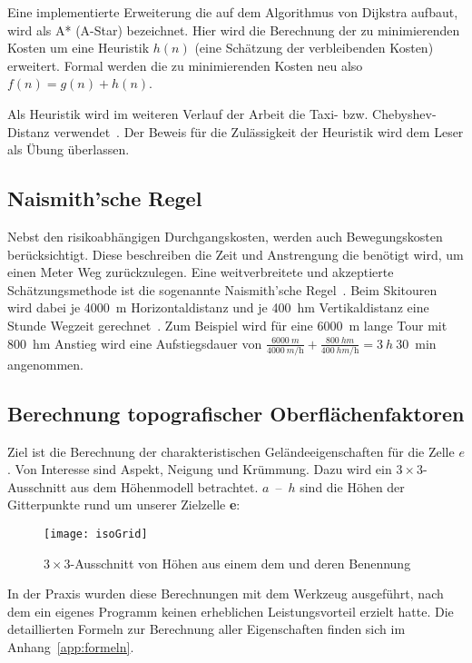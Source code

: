 Eine implementierte Erweiterung die auf dem Algorithmus von Dijkstra aufbaut, wird als A* (A-Star) bezeichnet. Hier wird die Berechnung der zu minimierenden Kosten um eine Heuristik $h(n)$ (eine Schätzung der verbleibenden Kosten) erweitert. Formal werden die zu minimierenden Kosten neu also $f(n)=g(n)+h(n)$.~\cite{Hart1968}

Als Heuristik wird im weiteren Verlauf der Arbeit die Taxi- bzw. Chebyshev-Distanz verwendet~\cite{cantrell2000modern}. Der Beweis für die Zulässigkeit der Heuristik wird dem Leser als Übung überlassen. 

\subsection{Naismith'sche Regel}

Nebst den risikoabhängigen Durchgangskosten, werden auch Bewegungskosten berücksichtigt. Diese beschreiben die Zeit und Anstrengung die benötigt wird, um einen Meter Weg zurückzulegen. Eine weitverbreitete und akzeptierte Schätzungsmethode ist die sogenannte Naismith'sche Regel~\cite{naismithsrule}.
Beim Skitouren wird dabei je \qty{4000}{m} Horizontaldistanz und je \qty{400}{hm} Vertikaldistanz eine Stunde Wegzeit gerechnet~\cite{sacbergspwinter}\cite{naismithsrule}. 
Zum Beispiel wird für eine \qty{6000}{m} lange Tour mit \qty{800}{hm} Anstieg wird eine Aufstiegsdauer von $\frac{\qty{6000}{m}}{\qty{4000}{m\per\hour}} + \frac{\qty{800}{hm}}{\qty{400}{hm\per\hour}} = \qty{3}{h}\ \qty{30}{\min}$ angenommen.

\subsection{Berechnung topografischer Oberflächenfaktoren}
Ziel ist die Berechnung der charakteristischen Geländeeigenschaften für die Zelle $e$.
Von Interesse sind Aspekt, Neigung und Krümmung.
Dazu wird ein $3 \times 3$-Ausschnitt aus dem Höhenmodell betrachtet. 
$a$~--~$h$ sind die Höhen der Gitterpunkte rund um unserer Zielzelle \textbf{e}:

\begin{figure}[H]
  \centering
  \texttt{[image: isoGrid]}
  \caption{$3 \times 3$-Ausschnitt von Höhen aus einem \acrshort{dem} und deren Benennung}
\end{figure}

In der Praxis wurden diese Berechnungen mit dem Werkzeug  ausgeführt, nach dem ein eigenes Programm keinen erheblichen Leistungsvorteil erzielt hatte. Die detaillierten Formeln zur Berechnung aller Eigenschaften finden sich im Anhang~\ref{app:formeln}.


